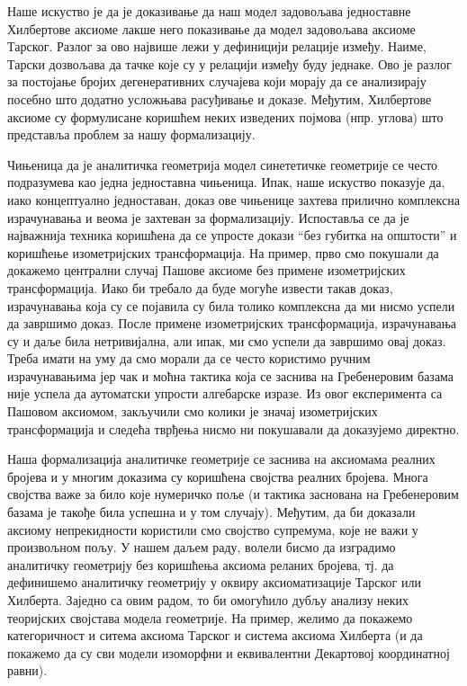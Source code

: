 Наше искуство је да је доказивање да наш модел задовољава једноставне
Хилбертове аксиоме лакше него показивање да модел задовољава аксиоме
Тарског. Разлог за ово највише лежи у дефиницији релације
између. Наиме, Тарски дозвољава да тачке које су у релацији између
буду једнаке. Ово је разлог за постојање бројих дегенеративних
случајева који морају да се анализирају посебно што додатно усложњава
расуђивање и доказе. Међутим, Хилбертове аксиоме су формулисане
коришћем неких изведених појмова (нпр. углова) што представља проблем
за нашу формализацију.

Чињеница да је аналитичка геометрија модел синететичке геометрије се
често подразумева као једна једноставна чињеница. Ипак, наше искуство
показује да, иако концептуално једноставан, доказ ове чињенице захтева
прилично комплексна израчунавања и веома је захтеван за
формализацију. Испоставља се да је најважнија техника коришћена да се
упросте докази ``без губитка на општости'' и коришћење изометријских
трансформација. На пример, прво смо покушали да докажемо централни
случај Пашове аксиоме без примене изометријских трансформација. Иако
би требало да буде могуће извести такав доказ, израчунавања која су се
појавила су била толико комплексна да ми нисмо успели да завршимо
доказ. После примене изометријских трансформација, израчунавања су и
даље била нетривијална, али ипак, ми смо успели да завршимо овај
доказ. Треба имати на уму да смо морали да се често користимо ручним
израчунавањима јер чак и моћна тактика која се заснива на Гребенеровим
базама није успела да аутоматски упрости алгебарске изразе. Из овог
експеримента са Пашовом аксиомом, закључили смо колики је значај
изометријских трансформација и следећа тврђења нисмо ни покушавали да
доказујемо директно.

Наша формализација аналитичке геометрије се заснива на аксиомама
реалних бројева и у многим доказима су коришћена својства реалних
бројева. Многа својства важе за било које нумеричко поље (и тактика
заснована на Гребенеровим базама је такође била успешна и у том
случају). Међутим, да би доказали аксиому непрекидности користили смо
својство супремума, које не важи у произвољном пољу. У нашем даљем
раду, волели бисмо да изградимо аналитичку геометрију без коришћења
аксиома реланих бројева, тј. да дефинишемо аналитичку геометрију у
оквиру аксиоматизације Тарског или Хилберта. Заједно са овим радом, то
би омогућило дубљу анализу неких теоријских својстава модела
геометрије. На пример, желимо да покажемо категоричност и ситема
аксиома Тарског и система аксиома Хилберта (и да покажемо да су сви
модели изоморфни и еквивалентни Декартовој координатној равни).


